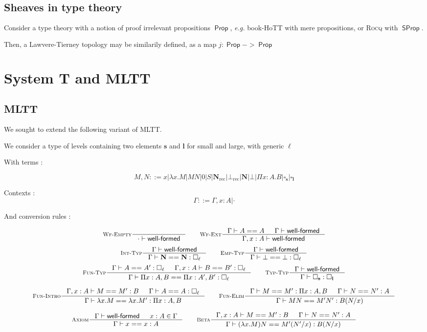 \documentclass{article}
\DeclareMathOperator{\Prop}{\mathsf{Prop}}
\DeclareMathOperator{\SProp}{\mathsf{SProp}}
\DeclareMathOperator{\rec}{rec}
\newcommand{\0}{\mathbf{0}}
\newcommand{\1}{\mathbf{1}}
\newcommand{\nat}{\mathbf{N}}
\newcommand{\Wf}{\textsf{well-formed}}
\newcommand{\slvl}{\mathbf{s}}
\newcommand{\llvl}{\mathbf{l}}
\begin{document}
\subsection{Sheaves in type theory}

Consider a type theory with a notion of proof irrelevant propositions $\Prop$, \emph{e.g.} book-HoTT with mere propositions, or \textsc{Rocq} with $\SProp$.

Then, a Lawvere-Tierney topology may be similarily defined, as a map $j : \Prop -> \Prop$

\section{System T and MLTT}
\subsection{MLTT}
We sought to extend the following variant of MLTT.

We consider a type of levels containing two elements $\slvl$ and $\llvl$ for small and large, with generic $\ell$

With terms :

$$ M,N ::= x | \lambda x. M | MN | 0 | S | \nat_{\rec} | \bot_{\rec} | \nat | \bot | \Pi x :A.B | \square_\slvl | \square_\llvl$$


Contexts :
$$ \Gamma ::= \Gamma, x : A | \cdot $$

And conversion rules :

$$
    \inference[\textsc{Wf-Empty}]{}{\cdot |- \Wf} \qquad
    \inference[\textsc{Wf-Ext}]{\Gamma |- A == A & \Gamma |- \Wf}{ \Gamma, x : A |- \Wf}
$$
$$
    \inference[\textsc{Int-Typ}]{\Gamma |- \Wf}{\Gamma |- \nat == \nat : \square_\ell} \qquad
    \inference[\textsc{Emp-Typ}]{\Gamma |- \Wf}{\Gamma |- \bot == \bot : \square_\ell}
$$
$$
    \inference[\textsc{Fun-Typ}]{\Gamma |- A == A' : \square_\ell & \Gamma, x : A |- B == B' : \square_\ell}{\Gamma |- \Pi x  : A, B == \Pi x: A', B' : \square_\ell} \qquad
    \inference[\textsc{Typ-Typ}]{\Gamma |- \Wf}{\Gamma |- \square_\slvl : \square_\llvl}
$$


$$
    \inference[\textsc{Fun-Intro}]{\Gamma, x : A |- M == M' : B &\Gamma |- A == A : \square_\ell}{\Gamma |- \lambda x. M == \lambda x. M' : \Pi x : A, B} \qquad
    \inference[\textsc{Fun-Elim}]{\Gamma |- M == M' : \Pi x:A, B& \Gamma |- N == N' : A}{\Gamma |- MN == M'N' : B(N/x)}
$$

$$
    \inference[\textsc{Axiom}]{\Gamma |- \Wf & x : A \in \Gamma }{\Gamma |- x == x : A} \qquad
    \inference[\textsc{Beta}]{\Gamma, x : A |- M == M' : B & \Gamma |- N == N' : A}{\Gamma |- (\lambda x. M)N == M'(N'/x) : B(N/x)}
$$
\end{document}

